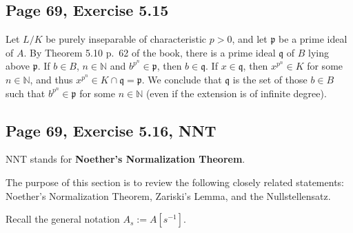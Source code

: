\documentclass[parskip=half,fontsize=12pt]{scrartcl}%
\newcommand{\mf}{\mathfrak}
\newcommand{\ppp}{\mf p}
\newcommand{\qqq}{\mf q}
\begin{document}
\subsection{Page 69, Exercise 5.15}%

Let $L/K$ be purely inseparable of characteristic $p>0$, and let $\ppp$ be a prime ideal of $A$. By Theorem 5.10 p.~62 of the book, there is a prime ideal $\qqq$ of $B$ lying above $\ppp$. If $b\in B$, $n\in\mathbb N$ and $b^{p^n}\in\ppp$, then $b\in\qqq$. If $x\in\qqq$, then $x^{p^n}\in K$ for some $n\in\mathbb N$, and thus $x^{p^n}\in K\cap\qqq=\ppp$. We conclude that $\qqq$ is the set of those $b\in B$ such that $b^{p^n}\in\ppp$ for some $n\in\mathbb N$ (even if the extension is of infinite degree).

\subsection{Page 69, Exercise 5.16, NNT}\label{nnt}%

NNT stands for \textbf{Noether's Normalization Theorem}.

The purpose of this section is to review the following closely related statements: Noether's Normalization Theorem, Zariski's Lemma, %
and the Nullstellensatz.


Recall the general notation $A_s:=A[s^{-1}]$.%
\end{document}
